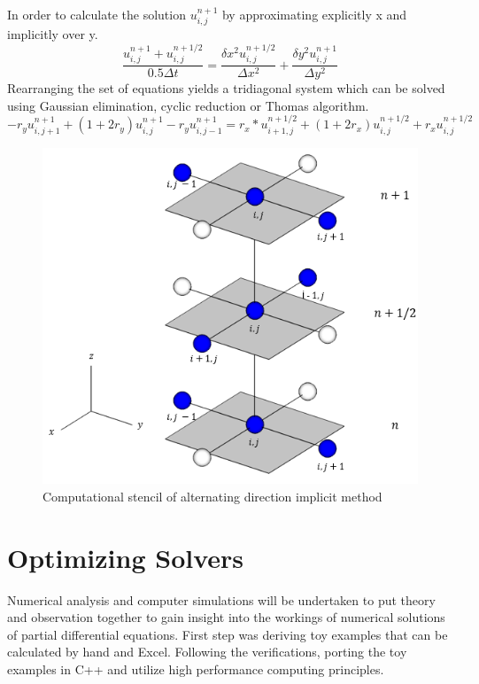 \documentclass[12pt, oneside]{book}
\theoremstyle{plain}
\theoremstyle{definition}
\begin{document}
In order to calculate the solution $u^{n+1}_{i,j}$ by approximating explicitly x and implicitly over y.
\begin{equation}
\frac{u^{n+1}_{i,j} + u^{n+1/2}_{i,j}}{0.5 \Delta t} = \frac{\delta x^2 u^{n+1/2}_{i,j} }{\Delta x^2} + \frac{\delta y^2 u^{n+1}_{i,j}}{\Delta y^2}
\end{equation}
Rearranging the set of equations yields a tridiagonal system which can be solved using Gaussian elimination, cyclic reduction or Thomas algorithm.
\begin{equation}
-r_y u^{n+1}_{i,j+1} + (1 + 2r_y) u^{n+1}_{i,j} - r_y u^{n+1}_{i,j-1} = r_x * u^{n+1/2}_{i+1,j} + (1 + 2r_x) u^{n+1/2}_{i,j} + r_x u^{n+1/2}_{i,j}
\end{equation}

\begin{figure}[!htb]
    \centering
        \includegraphics[scale=0.8]{ADI.png}
    \caption{Computational stencil of alternating direction implicit method}
\end{figure}

\chapter{Optimizing Solvers}
Numerical analysis and computer simulations will be undertaken to put theory and observation together to gain insight into the workings of numerical solutions of partial differential equations. First step was deriving toy examples that can be calculated by hand and Excel. Following the verifications, porting the toy examples in C++ and utilize high performance computing principles.
\end{document}
